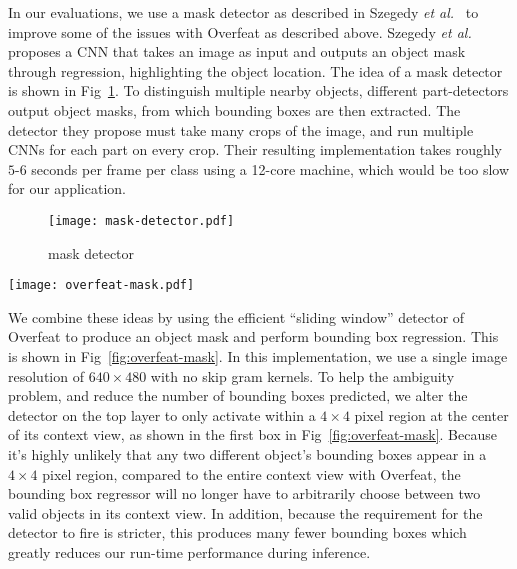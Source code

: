 \documentclass[journal]{IEEEtran}
\begin{document}
In our evaluations, we use a mask detector as described in Szegedy \textit{et al.}~\cite{szegedy-2013} to improve some of the issues with Overfeat as described above. Szegedy \textit{et al.} proposes a CNN that takes an image as input and outputs an object mask through regression, highlighting the object location. The idea of a mask detector is shown in Fig~\ref{fig:mask-detector}. To distinguish multiple nearby objects, different part-detectors output object masks, from which bounding boxes are then extracted. The detector they propose must take many crops of the image, and run multiple CNNs for each part on every crop. Their resulting implementation takes roughly $5$-$6$ seconds per frame per class using a 12-core machine, which would be too slow for our application.

\begin{figure}[tb]
  \centering
    \texttt{[image: mask-detector.pdf]}
 \caption{mask detector}
 \label{fig:mask-detector}
\end{figure}


\begin{figure*}[tb]
  \centering
    \texttt{[image: overfeat-mask.pdf]}
 \caption{overfeat-mask}
 \label{fig:overfeat-mask}
\end{figure*}

We combine these ideas by using the efficient ``sliding window'' detector of Overfeat to produce an object mask and perform bounding box regression. This is shown in Fig~\ref{fig:overfeat-mask}. In this implementation, we use a single image resolution of $640 \times 480$ with no skip gram kernels. To help the ambiguity problem, and reduce the number of bounding boxes predicted, we alter the detector on the top layer to only activate within a $4 \times 4$ pixel region at the center of its context view, as shown in the first box in Fig~\ref{fig:overfeat-mask}. Because it's highly unlikely that any two different object's bounding boxes appear in a $4 \times 4$ pixel region, compared to the entire context view with Overfeat, the bounding box regressor will no longer have to arbitrarily choose between two valid objects in its context view. In addition, because the requirement for the detector to fire is stricter, this produces many fewer bounding boxes which greatly reduces our run-time performance during inference.
\end{document}
